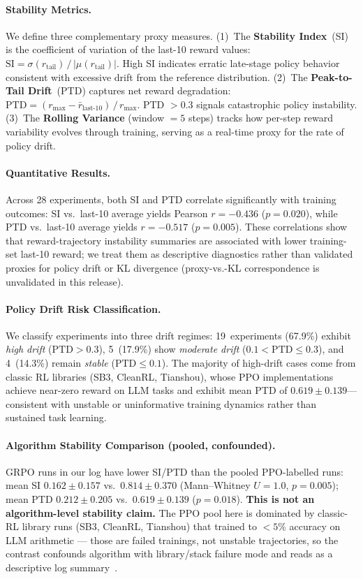 \documentclass{article}
\begin{document}
\paragraph{Stability Metrics.}
We define three complementary proxy measures.
(1)~The \textbf{Stability Index}~(SI) is the coefficient of variation of
the last-10 reward values:
$\mathrm{SI} = \sigma(r_{\text{tail}}) \,/\, |\mu(r_{\text{tail}})|$.
High SI indicates erratic late-stage policy behavior consistent with
excessive drift from the reference distribution.
(2)~The \textbf{Peak-to-Tail Drift}~(PTD) captures net reward degradation:
$\mathrm{PTD} = (r_{\max} - \bar{r}_{\text{last-10}}) \,/\, r_{\max}$.
PTD $> 0.3$ signals catastrophic policy instability.
(3)~The \textbf{Rolling Variance} (window $= 5$ steps) tracks how
per-step reward variability evolves through training, serving as a
real-time proxy for the rate of policy drift.

\paragraph{Quantitative Results.}
Across 28 experiments, both SI and PTD correlate significantly with
training outcomes:
SI vs.\ last-10 average yields Pearson $r = -0.436$ ($p = 0.020$),
while PTD vs.\ last-10 average yields $r = -0.517$ ($p = 0.005$).
These correlations show that reward-trajectory instability summaries
are associated with lower training-set last-10 reward; we treat them
as descriptive diagnostics rather than validated proxies for policy
drift or KL divergence (proxy-vs.-KL correspondence is unvalidated
in this release).

\paragraph{Policy Drift Risk Classification.}
We classify experiments into three drift regimes:
19~experiments (67.9\%) exhibit \emph{high drift}
($\text{PTD} > 0.3$), 5~(17.9\%) show \emph{moderate drift}
($0.1 < \text{PTD} \leq 0.3$), and 4~(14.3\%) remain \emph{stable}
($\text{PTD} \leq 0.1$). The majority of high-drift cases come from
classic RL libraries (SB3, CleanRL, Tianshou), whose PPO
implementations achieve near-zero reward on LLM tasks and exhibit
mean PTD of $0.619 \pm 0.139$---consistent with unstable or uninformative
training dynamics rather than sustained task learning.

\paragraph{Algorithm Stability Comparison (pooled, confounded).}
GRPO runs in our log have lower SI/PTD than the pooled PPO-labelled
runs: mean SI $0.162 \pm 0.157$ vs.\ $0.814 \pm 0.370$
(Mann--Whitney $U = 1.0$, $p = 0.005$); mean PTD $0.212 \pm 0.205$
vs.\ $0.619 \pm 0.139$ ($p = 0.018$). \textbf{This is not an
algorithm-level stability claim.} The PPO pool here is dominated by
classic-RL library runs (SB3, CleanRL, Tianshou) that trained to
$<5\%$ accuracy on LLM arithmetic --- those are failed trainings, not
unstable trajectories, so the contrast confounds algorithm with
library/stack failure mode and reads as a
descriptive log summary~\citep{shao2024deepseekmath}.
\end{document}
